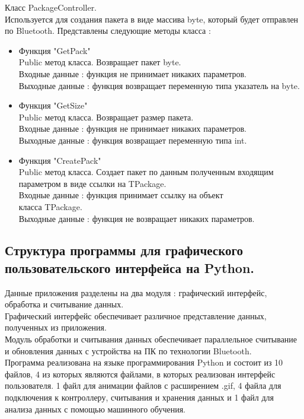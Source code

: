 \documentclass[a4document]{article}
\begin{document}
{\begin{itemize}
        
        Класс PackageController. \\
        Используется для создания пакета в виде массива byte, который будет отправлен по Bluetooth.
        Представлены следующие методы класса : 
            \begin{itemize}
                \item Функция "GetPack" \\
                    Public метод класса. Возвращает пакет byte. \\
                    Входные данные : функция не принимает никаких параметров. \\
                    Выходные данные : функция возвращает переменную типа указатель на byte.
                \item Функция "GetSize" \\
                    Public метод класса. Возвращает размер пакета. \\
                    Входные данные : функция не принимает никаких параметров. \\
                    Выходные данные : функция возвращает переменную типа int.
                \item Функция "CreatePack" \\
                    Public метод класса. Создает пакет по данным полученным входящим параметром в виде ссылки на TPackage.\\
                    Входные данные : функция принимает ссылку на объект\\ класса TPackage.\\
                    Выходные данные : функция не возвращает никаких параметров.
            \end{itemize}

        
    
\end{itemize}

\newpage

\subsection*{Структура программы для графического пользовательского интерфейса на Python.}
Данные приложения разделены на два модуля : графический интерфейс, обработка и считывание данных.\\
Графический интерфейс обеспечивает различное представление данных, полученных из приложения.\\
Модуль обработки и считывания данных обеспечивает параллельное считывание и обновления данных с устройства
на ПК по технологии Bluetooth.\\
Программа реализована на языке программирования Python и состоит из 10 файлов, 4 из которых являются файлами, в которых реализован интерфейс 
пользователя. 1 файл для анимации файлов с расширением .gif, 4 файла для подключения к контроллеру, считывания и хранения данных и 1 файл
для анализа данных с помощью машинного обучения.


}
\end{document}
